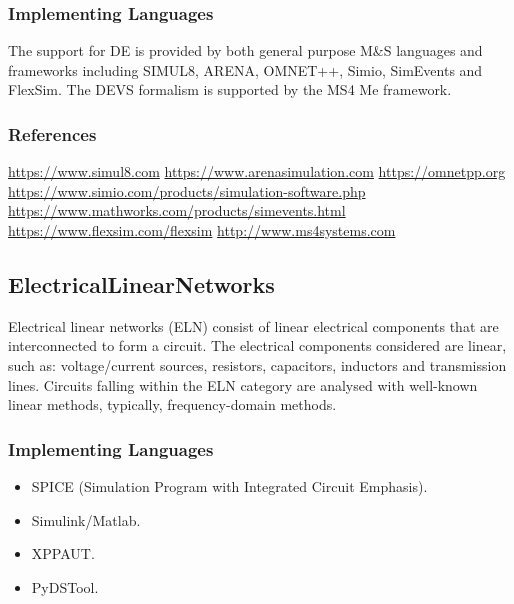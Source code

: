 \subsubsection{Implementing Languages}
The support for DE is provided by both general purpose M\&S languages and frameworks including SIMUL8, ARENA, OMNET++, Simio, SimEvents and FlexSim. The DEVS formalism is supported by the MS4 Me framework.
\subsubsection{References}
\url{https://www.simul8.com}
\url{https://www.arenasimulation.com}
\url{https://omnetpp.org}
\url{https://www.simio.com/products/simulation-software.php}
\url{https://www.mathworks.com/products/simevents.html}
\url{https://www.flexsim.com/flexsim}
\url{http://www.ms4systems.com}





\subsection{ElectricalLinearNetworks}
\label{subsecF:ElectricalLinearNetworks}

Electrical linear networks (ELN) consist of linear electrical components that are interconnected to form a circuit. The electrical components considered are linear, such as: voltage/current sources, resistors, capacitors, inductors and transmission lines. Circuits falling within the ELN category are analysed with well-known linear methods, typically, frequency-domain methods.

\subsubsection{Implementing Languages}

\begin{itemize}
  \item SPICE (Simulation Program with Integrated Circuit Emphasis).
    \item Simulink/Matlab.
    \item XPPAUT.
    \item PyDSTool.
\end{itemize}


